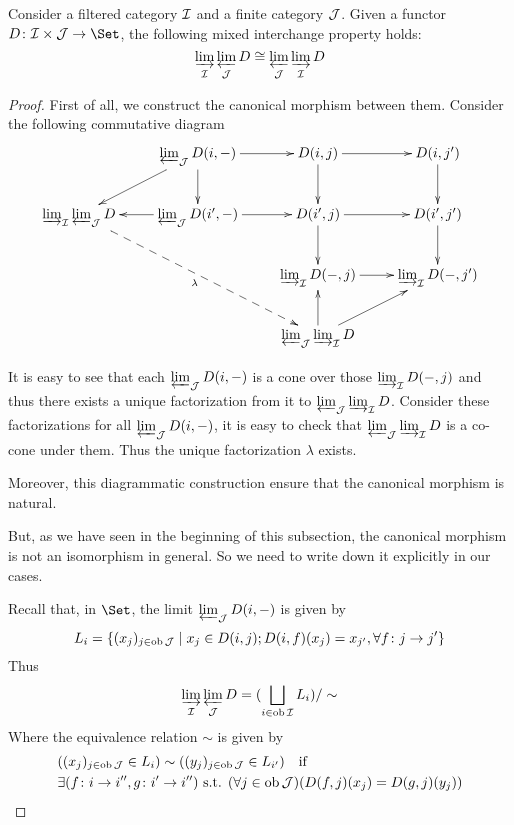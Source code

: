   \begin{thm}\label{thm:mixed interchange property}
    Consider a filtered category ${\cal I}$ and a finite category ${\cal J}$. Given a functor $D\colon\Ii\times\Jj\to\Set$, the following mixed interchange property holds:
    \begin{equation*}
      \operatorname*{\underrightarrow{\lim}}_{{\cal I}}\operatorname*{\underleftarrow{\lim}}_{{\cal J}} D \cong \operatorname*{\underleftarrow{\lim}}_{{\cal J}}\operatorname*{\underrightarrow{\lim}}_{{\cal I}} D
    \end{equation*}
  \end{thm}
  \begin{proof}
    First of all, we construct the canonical morphism between them. Consider the following commutative diagram
    \begin{displaymath}
      \xymatrix{
      &{\invlim_{\Jj} D(i,-)}\ar[r]\ar[d]\ar[dl]
      &{D(i,j)}\ar[r]\ar[d]
      &{D(i,j')}\ar[d]
      \\{\dirlim_{\Ii}\invlim_{\Jj} D}\ar@{-->}[ddrr]_{\lambda}
      &{\invlim_{\Jj} D(i',-)}\ar[r]\ar[l]
      &{D(i',j)}\ar[r]\ar[d]
      &{D(i',j')}\ar[d]
      \\&&{\dirlim_{\Ii} D(-,j)}\ar[r]
      &{\dirlim_{\Ii} D(-,j')}
      \\&&{\invlim_{\Jj}\dirlim_{\Ii} D}\ar[u]\ar[ur]
      &
      }
    \end{displaymath}

    It is easy to see that each $\operatorname*{\underleftarrow{\lim}}_{{\cal J}} D(i,-)$ is a cone over those $\operatorname*{\underrightarrow{\lim}}_{{\cal I}} D(-,j)$ and thus there exists a unique factorization from it to $\operatorname*{\underleftarrow{\lim}}_{{\cal J}}\operatorname*{\underrightarrow{\lim}}_{{\cal I}} D$. Consider these factorizations for all $\operatorname*{\underleftarrow{\lim}}_{{\cal J}} D(i,-)$, it is easy to check that $\operatorname*{\underleftarrow{\lim}}_{{\cal J}}\operatorname*{\underrightarrow{\lim}}_{{\cal I}} D$ is a co-cone under them. Thus the unique factorization $\lambda$ exists.

    Moreover, this diagrammatic construction ensure that the canonical morphism is natural.

    But, as we have seen in the beginning of this subsection, the canonical morphism is not an isomorphism in general. So we need to write down it explicitly in our cases.

    Recall that, in $\Set$, the limit $\operatorname*{\underleftarrow{\lim}}_{{\cal J}} D(i,-)$ is given by
    \begin{equation*}
      L_i=\{(x_j)_{j\in\operatorname{ob}{\cal J}}\mid x_j\in D(i,j); D(i,f)(x_j)=x_{j'}, \forall f\colon j\to j'\}
    \end{equation*}
    Thus
    \begin{equation*}
      \operatorname*{\underrightarrow{\lim}}_{{\cal I}}\operatorname*{\underleftarrow{\lim}}_{{\cal J}} D = (\bigsqcup_{i\in\operatorname{ob}{\cal I}} L_i)/\sim
    \end{equation*}
    Where the equivalence relation $\sim$ is given by
    \begin{align*}
      &((x_j)_{j\in\operatorname{ob}{\cal J}}\in L_i) \sim ((y_j)_{j\in\operatorname{ob}{\cal J}}\in L_{i'})\quad \text{if}\\
      & \exists(f\colon i\to i'',g\colon i'\to i'')\textrm{ s.t. }(\forall j\in\operatorname{ob}{\cal J})(D(f,j)(x_j)=D(g,j)(y_j))
    \end{align*}


\end{proof}
